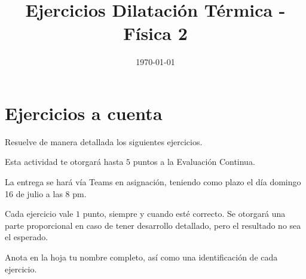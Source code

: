 \documentclass[14pt]{extarticle}
\title{\vspace*{-2cm} Ejercicios Dilatación Térmica - Física 2\vspace{-5ex}}
\date{\today}
\begin{document}
\maketitle

\section{Ejercicios a cuenta}

Resuelve de manera detallada los siguientes ejercicios.

Esta actividad te otorgará hasta  $5$ puntos a la Evaluación Continua.

La entrega se hará vía Teams en asignación, teniendo como plazo el día domingo 16 de julio a las 8 pm.

Cada ejercicio vale $1$ punto, siempre y cuando esté correcto. Se otorgará una parte proporcional en caso de tener desarrollo detallado, pero el resultado no sea el esperado.

Anota en la hoja tu nombre completo, así como una identificación de cada ejercicio.
\end{document}
